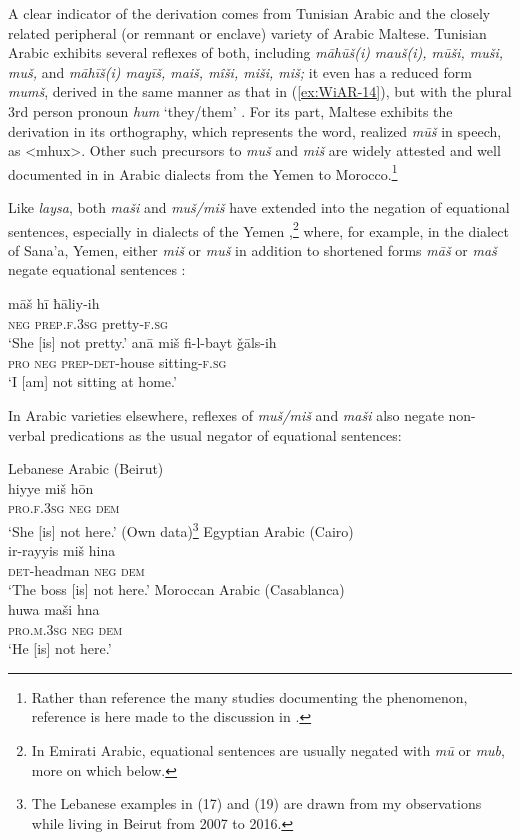 \documentclass[output=paper]{langsci/langscibook}
\begin{document}
A clear indicator of the derivation comes from Tunisian Arabic and the closely related peripheral (or remnant or enclave) variety of Arabic Maltese. Tunisian Arabic exhibits several reflexes of both, including \textit{māhūš(i)} \textit{mauš(i), mūši, muši, muš,} and \textit{māhīš(i) mayīš, maiš, mîši, miši, miš;} it even has a reduced form \textit{mumš}, derived in the same manner as that in (\ref{ex:WiAR-14}), but with the plural 3rd person pronoun \textit{hum} ‘they/them’ \citep[718]{singer1984a}. For its part, Maltese exhibits the derivation in its orthography, which represents the word, realized \textit{mūš} in speech, as <mhux>. Other such precursors to \textit{muš} and \textit{miš} are widely attested and well documented in in Arabic dialects from the Yemen to Morocco.\footnote{Rather than reference the many studies documenting the phenomenon, reference is here made to the discussion in \citet[100-101]{wilmsen2014a}.}

Like \textit{laysa}, both \textit{maši} and \textit{muš/miš} have extended into the negation of equational sentences, especially in dialects of the Yemen \citep[253, 258]{watson1993a},\footnote{In Emirati Arabic, equational sentences are usually negated with \textit{mū} or \textit{mub}, more on which below. } where, for example, in the dialect of Sana’a, Yemen, either \textit{miš} or \textit{muš} in addition to shortened forms \textit{māš} or \textit{maš} negate equational sentences \citep[253-256]{watson1993a}:

\ea \label{ex:WiAR-15}
  \ea
  	\gll māš hī ħāliy-ih\\
  	\textsc{neg} \textsc{prep.f.3sg} pretty-\textsc{f.sg}\\
  	\glt ‘She [is] not pretty.’ \citep[256]{watson1993a}
  \ex
  	\gll anā miš fi-l-bayt ǧāls-ih\\
  	\textsc{pro} \textsc{neg} \textsc{prep-det}-house sitting-\textsc{f.sg}\\
  	\glt ‘I [am] not sitting at home.’ \citep[258]{watson1993a}
\z \z

In Arabic varieties elsewhere, reflexes of \textit{muš/miš} and \textit{maši} also negate non-verbal predications as the usual negator of equational sentences:

\ea \label{ex:WiAR-16}
  \ea Lebanese Arabic (Beirut)\\
  	\gll hiyye miš hōn \\
  	\textsc{pro.f.3sg} \textsc{neg} \textsc{dem}\\
  	\glt ‘She [is] not here.’ (Own data)\footnote{The Lebanese examples in (17) and (19) are drawn from my observations while living in Beirut from 2007 to 2016.}
  \ex Egyptian Arabic (Cairo)\\
  	\gll ir-rayyis miš hina\\
  	\textsc{det}-headman \textsc{neg} \textsc{dem}\\
    \glt ‘The boss [is] not here.’ \citep[334]{woidich2006a}
  \ex Moroccan Arabic (Casablanca)\\
  	\gll huwa maši hna \\
  	\textsc{pro.m.3sg} \textsc{neg} \textsc{dem}\\
  	\glt ‘He [is] not here.’ \citep[155]{harrell2004a}
\z \z
\end{document}
